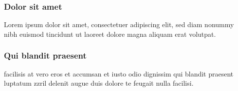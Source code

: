 \documentclass[]{../metanetpaper}
\begin{document}
	\subsubsection{Dolor sit amet}
	Lorem ipsum dolor sit amet, consectetuer adipiscing elit, sed diam nonummy nibh euismod tincidunt ut laoreet dolore magna aliquam erat volutpat.\\
	
	\subsubsection{Qui blandit praesent}
	facilisis at vero eros et accumsan et iusto odio dignissim qui blandit praesent luptatum zzril delenit augue duis dolore te feugait nulla facilisi.\\
	
	
	\clearpage
\end{document}
